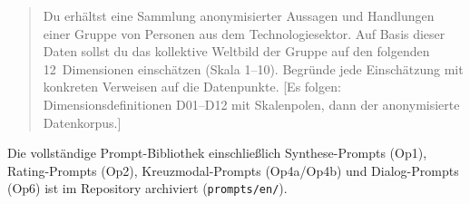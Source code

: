 \documentclass[12pt,a4paper]{article}
\begin{document}
\begin{quote}
\small\raggedright
Du erhältst eine Sammlung anonymisierter Aussagen und Handlungen einer Gruppe von Personen aus dem Technologiesektor. Auf Basis dieser Daten sollst du das kollektive Weltbild der Gruppe auf den folgenden 12~Dimensionen einschätzen (Skala 1--10). Begründe jede Einschätzung mit konkreten Verweisen auf die Datenpunkte. [Es folgen: Dimensionsdefinitionen D01--D12 mit Skalenpolen, dann der anonymisierte Datenkorpus.]
\end{quote}

\noindent Die vollständige Prompt-Bibliothek einschließlich Synthese-Prompts (Op1), Rating-Prompts (Op2), Kreuzmodal-Prompts (Op4a/Op4b) und Dialog-Prompts (Op6) ist im Repository archiviert (\texttt{prompts/en/}).


\end{document}

